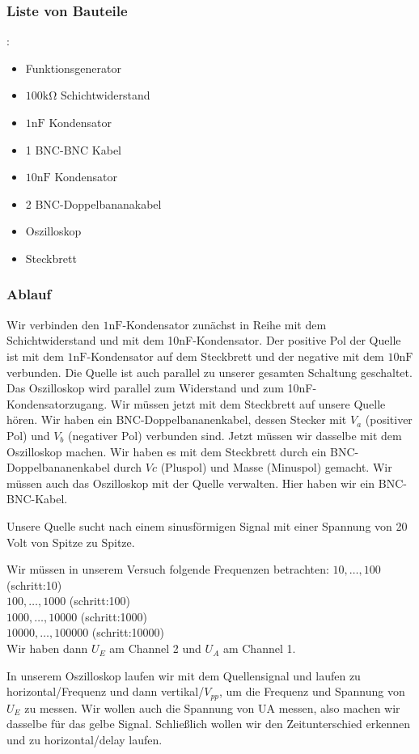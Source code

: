 \subsubsection{Liste von Bauteile}:
\begin{itemize}
  \item Funktionsgenerator
  \item $100 \si{\kilo\ohm}$ Schichtwiderstand
  \item $1\si{\nano\farad}$ Kondensator
  \item 1 BNC-BNC Kabel
  \item $10 \si{\nano\farad}$ Kondensator
  \item 2 BNC-Doppelbananakabel
  \item Oszilloskop
  \item Steckbrett
\end{itemize}
\subsubsection{Ablauf}
Wir verbinden den $1\si{\nano\farad}$-Kondensator zunächst in Reihe mit dem Schichtwiderstand und mit dem 10nF-Kondensator. Der positive Pol der Quelle ist mit dem $1\si{\nano\farad}$-Kondensator auf dem Steckbrett und der negative mit dem $10 \si{\nano\farad}$ verbunden. Die Quelle ist auch parallel zu unserer gesamten Schaltung geschaltet. Das Oszilloskop wird parallel zum Widerstand und zum 10nF-Kondensatorzugang. Wir müssen jetzt mit dem Steckbrett auf unsere Quelle hören. Wir haben ein BNC-Doppelbananenkabel, dessen Stecker mit $V_a$ (positiver Pol) und $V_b$ (negativer Pol) verbunden sind. Jetzt müssen wir dasselbe mit dem Oszilloskop machen. Wir haben es mit dem Steckbrett durch ein BNC-Doppelbananenkabel durch $Vc$ (Pluspol) und Masse (Minuspol) gemacht. Wir müssen auch das Oszilloskop mit der Quelle verwalten. Hier haben wir ein BNC-BNC-Kabel.

Unsere Quelle sucht nach einem sinusförmigen Signal mit einer Spannung von 20 Volt von Spitze zu Spitze.

Wir müssen in unserem Versuch folgende Frequenzen betrachten:
$10,\dots,100$ (schritt:10)\\
$100,\dots,1000$ (schritt:100)\\
$1000,\dots,10000$ (schritt:1000)\\
$10000,\dots,100000$ (schritt:10000)\\
Wir haben dann $U_E$ am Channel 2 und $U_A$ am Channel 1.

In unserem Oszilloskop laufen wir mit dem Quellensignal und laufen zu horizontal/Frequenz und dann vertikal/$V_{pp}$, um die Frequenz und Spannung von $U_E$ zu messen. Wir wollen auch die Spannung von UA messen, also machen wir dasselbe für das gelbe Signal. Schließlich wollen wir den Zeitunterschied erkennen und zu horizontal/delay laufen.

